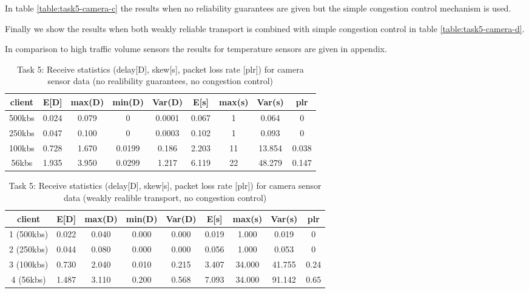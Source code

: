 In table \ref{table:task5-camera-c} the results when no reliability guarantees are given but the simple
congestion control mechanism is used.

Finally we show the results when both weakly reliable transport is combined with
simple congestion control in table \ref{table:task5-camera-d}.



In comparison to high traffic volume sensors the results for temperature sensors
are given in appendix.

\begin{table}
\centering
\begin{tabular}{|c|c|c|c|c|c|c|c|c|}
\hline
client & E[D] & max(D) & min(D) & Var(D) & E[s] & max(s) & Var(s) & plr\\
\hline
500kbs & 0.024 & 0.079 & 0 & 0.0001 &  0.067 & 1 & 0.064 & 0\\
\hline
250kbs & 0.047 & 0.100 & 0 & 0.0003 &  0.102 & 1 & 0.093 & 0\\
\hline
100kbs & 0.728 & 1.670 & 0.0199 & 0.186 & 2.203 & 11 & 13.854 & 0.038 \\
\hline
56kbs & 1.935 & 3.950 & 0.0299 & 1.217 & 6.119 & 22 & 48.279 & 0.147 \\
\hline
\end{tabular}
\caption{Task 5: Receive statistics (delay[D], skew[s], packet loss rate [plr]) for camera sensor data (no realibility guarantees, no congestion control)}
\label{table:task5-camera-a}
\end{table}


\begin{table}
\centering
\begin{tabular}{|c|c|c|c|c|c|c|c|c|}
\hline
client & E[D] & max(D) & min(D) & Var(D) & E[s] & max(s) & Var(s) & plr\\
\hline
1 (500kbs) & 0.022 & 0.040 & 0.000 & 0.000 & 0.019 & 1.000 & 0.019 & 0\\
\hline
2 (250kbs) & 0.044 & 0.080 & 0.000 & 0.000 & 0.056 & 1.000 & 0.053 & 0\\
\hline
3 (100kbs) & 0.730 & 2.040 & 0.010 & 0.215 & 3.407 & 34.000 & 41.755 & 0.24\\
\hline
4 (56kbs) & 1.487 & 3.110 & 0.200 & 0.568 & 7.093 & 34.000 & 91.142 & 0.65\\
\hline
\end{tabular}
\caption{Task 5: Receive statistics (delay[D], skew[s], packet loss rate [plr]) for camera sensor data (weakly realible transport, no congestion control)}
\label{table:task5-camera-b}
\end{table}


